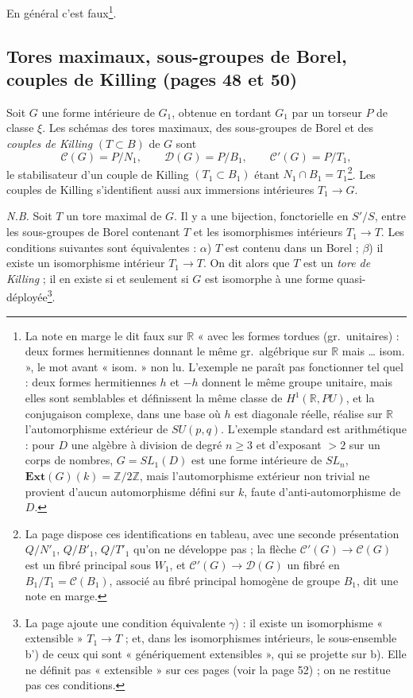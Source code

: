 \documentclass[11pt,a4paper]{article}
\begin{document}
En général c'est faux\footnote{La note en marge le dit faux sur $\mathbb{R}$
« avec les formes tordues (gr.\ unitaires) : deux formes hermitiennes donnant
le même gr.\ algébrique sur $\mathbb{R}$ mais … isom. », le mot avant « isom. »
non lu. L'exemple ne paraît pas fonctionner tel quel : deux formes hermitiennes
$h$ et $-h$ donnent le même groupe unitaire, mais elles sont semblables et
définissent la même classe de $H^1(\mathbb{R}, PU)$, et la conjugaison complexe,
dans une base où $h$ est diagonale réelle, réalise sur $\mathbb{R}$
l'automorphisme extérieur de $SU(p,q)$. L'exemple standard est arithmétique : pour $D$ une algèbre à division de degré
$n \geq 3$ et d'exposant $> 2$ sur un corps de nombres, $G = SL_1(D)$ est une forme
intérieure de $SL_n$, $\mathbf{Ext}(G)(k) = \mathbb{Z}/2\mathbb{Z}$, mais
l'automorphisme extérieur non trivial ne provient d'aucun automorphisme
défini sur $k$, faute d'anti-automorphisme de $D$.}.

\subsection*{Tores maximaux, sous-groupes de Borel, couples de Killing (pages 48 et 50)}

Soit $G$ une forme intérieure de $G_1$, obtenue en tordant $G_1$ par un torseur $P$
de classe $\xi$. Les schémas des tores maximaux, des sous-groupes de Borel et
des \emph{couples de Killing} $(T \subset B)$ de $G$ sont
\[
\mathcal{C}(G) = P/N_1, \qquad \mathcal{D}(G) = P/B_1, \qquad \mathcal{C}'(G) =
P/T_1,
\]
le stabilisateur d'un couple de Killing $(T_1 \subset B_1)$ étant
$N_1 \cap B_1 = T_1$\footnote{La page dispose ces identifications en tableau, avec
une seconde présentation $Q/N'_1$, $Q/B'_1$, $Q/T'_1$ qu'on ne développe pas ; la
flèche $\mathcal{C}'(G) \to \mathcal{C}(G)$ est un fibré principal sous $W_1$,
et $\mathcal{C}'(G) \to \mathcal{D}(G)$ un fibré en $B_1/T_1 = \mathcal{C}(B_1)$,
associé au fibré principal homogène de groupe $B_1$, dit une note en marge.}. Les couples de Killing s'identifient aussi aux
immersions intérieures $T_1 \to G$.

\emph{N.B.} Soit $T$ un tore maximal de $G$. Il y a une bijection, fonctorielle en
$S'/S$, entre les sous-groupes de Borel contenant $T$ et les isomorphismes
intérieurs $T_1 \to T$. Les conditions suivantes sont équivalentes : $\alpha$)
$T$ est contenu dans un Borel ; $\beta$) il existe un isomorphisme intérieur
$T_1 \to T$. On dit alors que $T$ est un \emph{tore de Killing} ; il en existe si
et seulement si $G$ est isomorphe à une forme quasi-déployée\footnote{La page
ajoute une condition équivalente $\gamma$) : il existe un isomorphisme
« extensible » $T_1 \to T$ ; et, dans les isomorphismes intérieurs, le
sous-ensemble b') de ceux qui sont « génériquement extensibles », qui se
projette sur b). Elle ne définit pas « extensible » sur ces pages (voir la
page 52) ; on ne restitue pas ces conditions.}.
\end{document}
